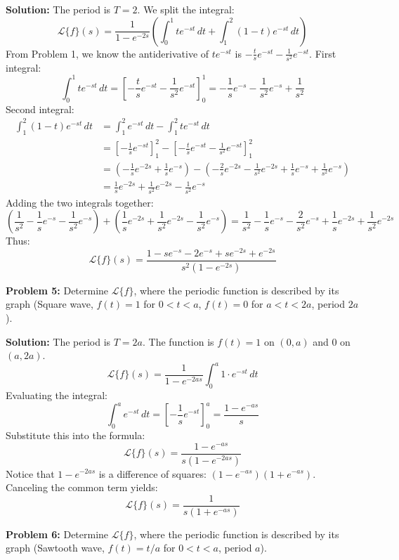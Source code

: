 \documentclass[11pt, letterpaper]{article}
\theoremstyle{definition}
\theoremstyle{remark}
\begin{document}
\textbf{Solution:}
The period is $T = 2$. We split the integral:
\[ \mathcal{L}\{f\}(s) = \frac{1}{1 - e^{-2s}} \left( \int_0^1 t e^{-st} \, dt + \int_1^2 (1-t) e^{-st} \, dt \right) \]
From Problem 1, we know the antiderivative of $t e^{-st}$ is $-\frac{t}{s}e^{-st} - \frac{1}{s^2}e^{-st}$.
First integral:
\[ \int_0^1 t e^{-st} \, dt = \left[ -\frac{t}{s}e^{-st} - \frac{1}{s^2}e^{-st} \right]_0^1 = -\frac{1}{s}e^{-s} - \frac{1}{s^2}e^{-s} + \frac{1}{s^2} \]
Second integral:
\begin{align*}
    \int_1^2 (1-t) e^{-st} \, dt &= \int_1^2 e^{-st} \, dt - \int_1^2 t e^{-st} \, dt \\
    &= \left[ -\frac{1}{s}e^{-st} \right]_1^2 - \left[ -\frac{t}{s}e^{-st} - \frac{1}{s^2}e^{-st} \right]_1^2 \\
    &= \left( -\frac{1}{s}e^{-2s} + \frac{1}{s}e^{-s} \right) - \left( -\frac{2}{s}e^{-2s} - \frac{1}{s^2}e^{-2s} + \frac{1}{s}e^{-s} + \frac{1}{s^2}e^{-s} \right) \\
    &= \frac{1}{s}e^{-2s} + \frac{1}{s^2}e^{-2s} - \frac{1}{s^2}e^{-s}
\end{align*}
Adding the two integrals together:
\[ \left( \frac{1}{s^2} - \frac{1}{s}e^{-s} - \frac{1}{s^2}e^{-s} \right) + \left( \frac{1}{s}e^{-2s} + \frac{1}{s^2}e^{-2s} - \frac{1}{s^2}e^{-s} \right) = \frac{1}{s^2} - \frac{1}{s}e^{-s} - \frac{2}{s^2}e^{-s} + \frac{1}{s}e^{-2s} + \frac{1}{s^2}e^{-2s} \]
Thus:
\[ \mathcal{L}\{f\}(s) = \frac{1 - s e^{-s} - 2e^{-s} + s e^{-2s} + e^{-2s}}{s^2(1 - e^{-2s})} \]

\vspace{1em}
\textbf{Problem 5:} Determine $\mathcal{L}\{f\}$, where the periodic function is described by its graph (Square wave, $f(t)=1$ for $0<t<a$, $f(t)=0$ for $a<t<2a$, period $2a$).

\textbf{Solution:}
The period is $T = 2a$. The function is $f(t) = 1$ on $(0, a)$ and $0$ on $(a, 2a)$.
\[ \mathcal{L}\{f\}(s) = \frac{1}{1 - e^{-2as}} \int_0^a 1 \cdot e^{-st} \, dt \]
Evaluating the integral:
\[ \int_0^a e^{-st} \, dt = \left[ -\frac{1}{s} e^{-st} \right]_0^a = \frac{1 - e^{-as}}{s} \]
Substitute this into the formula:
\[ \mathcal{L}\{f\}(s) = \frac{1 - e^{-as}}{s(1 - e^{-2as})} \]
Notice that $1 - e^{-2as}$ is a difference of squares: $(1 - e^{-as})(1 + e^{-as})$. Canceling the common term yields:
\[ \mathcal{L}\{f\}(s) = \frac{1}{s(1 + e^{-as})} \]

\vspace{1em}
\textbf{Problem 6:} Determine $\mathcal{L}\{f\}$, where the periodic function is described by its graph (Sawtooth wave, $f(t) = t/a$ for $0 < t < a$, period $a$).
\end{document}
